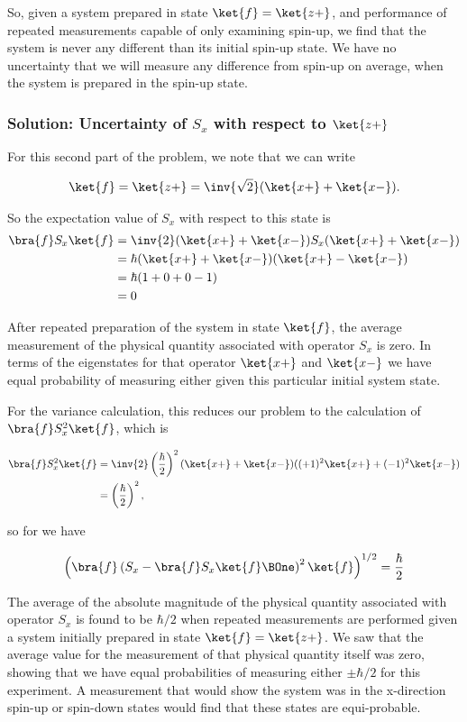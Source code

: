 So, given a system prepared in state $\ket{f} = \ket{z+}$, and performance of repeated measurements capable of only examining spin-up, we find that the system is never any different than its initial spin-up state.  We have no uncertainty that we will measure any difference from spin-up on average, when the system is prepared in the spin-up state.

\subsubsection{Solution:  Uncertainty of \texorpdfstring{$S_x$}{S x} with respect to \texorpdfstring{$\ket{z+}$}{ket z plus}}

For this second part of the problem, we note that we can write

\begin{align}\label{eqn:qmIproblemSet3:20}
\ket{f} = \ket{z+} = \inv{\sqrt{2}} ( \ket{x+} + \ket{x-} ).
\end{align}

So the expectation value of $S_x$ with respect to this state is
\begin{align*}
\bra{f} S_x \ket{f}
&=
\inv{2}
( \ket{x+} + \ket{x-} ) S_x ( \ket{x+} + \ket{x-} ) \\
&=
\hbar 
( \ket{x+} + \ket{x-} ) ( \ket{x+} - \ket{x-} ) \\
&=
\hbar 
( 1 + 0 + 0 -1 ) \\
&= 0
\end{align*}

After repeated preparation of the system in state $\ket{f}$, the average measurement of the physical quantity associated with operator $S_x$ is zero.  In terms of the eigenstates for that operator $\ket{x+}$ and $\ket{x-}$ we have equal probability of measuring either given this particular initial system state.

For the variance calculation, this reduces our problem to the calculation of $\bra{f} S_x^2 \ket{f}$, which is

\begin{align*}
\bra{f} S_x^2 \ket{f} 
&=
\inv{2} \left( \frac{\hbar}{2} \right)^2 
( \ket{x+} + \ket{x-} ) ( (+1)^2 \ket{x+} + (-1)^2 \ket{x-} ) \\
&=
\left( \frac{\hbar}{2} \right)^2,
\end{align*}

so for  we have

\begin{align}\label{eqn:qmIproblemSet3:4b}
\left(\bra{f} \left( S_x - \bra{f} S_x \ket{f} \BOne \right)^2 \ket{f} \right)^{1/2} = \frac{\hbar}{2}
\end{align}

The average of the absolute magnitude of the physical quantity associated with operator $S_x$ is found to be $\hbar/2$ when repeated measurements are performed given a system initially prepared in state $\ket{f} = \ket{z+}$.  We saw that the average value for the measurement of that physical quantity itself was zero, showing that we have equal probabilities of measuring either $\pm \hbar/2$ for this experiment.  A measurement that would show the system was in the x-direction spin-up or spin-down states would find that these states are equi-probable.
